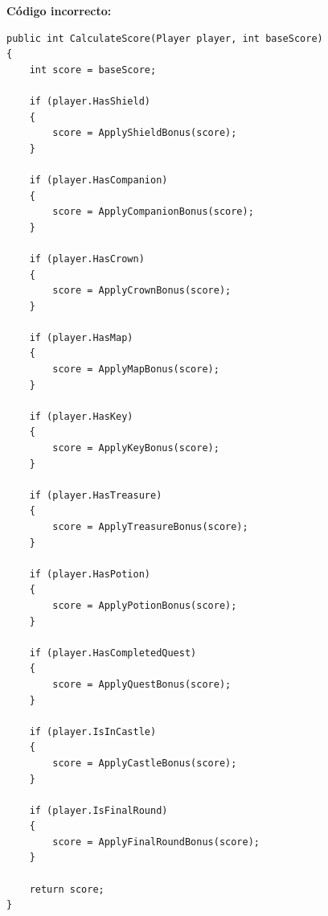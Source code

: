 \textbf{Código incorrecto:}
\begin{lstlisting}[style=csharpstyle]
public int CalculateScore(Player player, int baseScore)
{
    int score = baseScore;

    if (player.HasShield)
    {
        score = ApplyShieldBonus(score);
    }

    if (player.HasCompanion)
    {
        score = ApplyCompanionBonus(score);
    }

    if (player.HasCrown)
    {
        score = ApplyCrownBonus(score);
    }

    if (player.HasMap)
    {
        score = ApplyMapBonus(score);
    }

    if (player.HasKey)
    {
        score = ApplyKeyBonus(score);
    }

    if (player.HasTreasure)
    {
        score = ApplyTreasureBonus(score);
    }

    if (player.HasPotion)
    {
        score = ApplyPotionBonus(score);
    }

    if (player.HasCompletedQuest)
    {
        score = ApplyQuestBonus(score);
    }

    if (player.IsInCastle)
    {
        score = ApplyCastleBonus(score);
    }

    if (player.IsFinalRound)
    {
        score = ApplyFinalRoundBonus(score);
    }

    return score;
}
\end{lstlisting}
